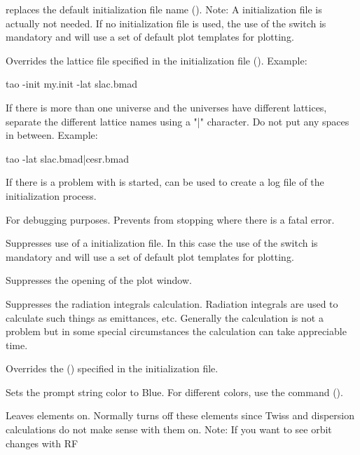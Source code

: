 \begin{description}
{{replaces the default \tao initialization file name
(). Note: A \tao initialization file is actually not
needed. If no \tao initialization file is used, the use of the
 switch is mandatory and \tao will use a set of default plot
templates for plotting.
%
\item[\vn{-lattice_file <file_name>}] \Newline
Overrides the 
lattice file specified in the \tao initialization file
(). Example:
\begin{example}
  tao -init my.init -lat slac.bmad
\end{example}
If there is more than one universe and the universes have different
lattices, separate the different lattice names using a "|" character.
Do not put any spaces in between. Example:
\begin{example}
  tao -lat slac.bmad|cesr.bmad
\end{example}
%
\item[\vn{-log_startup}]
If there is a problem with \tao is started,  can be used
to create a log file of the initialization process.
%
\item[\vn{-no_stopping}] \Newline
For debugging purposes. Prevents \tao from stopping where there is a fatal error.
%
\item[\vn{-noinit}] \Newline
Suppresses use of a \tao initialization file. In this case the use of
the  switch is mandatory and \tao will use a set of default
plot templates for plotting.
%
\item[\vn{-noplot}] \Newline
Suppresses the opening of the plot window.
%
\item[\vn{-no_rad_int}] \Newline
Suppresses the radiation integrals calculation. Radiation integrals are used to calculate such
things as emittances, etc. Generally the calculation is not a problem but in some special
circumstances the calculation can take appreciable time.
%
\item[\vn{-plot_file <file_name>}] \Newline
Overrides the  () specified in the
\tao initialization file.
%
\item[\vn{-prompt_color}] \Newline
Sets the prompt string color to Blue. For different colors, use the
 command ().
%
\item[\vn{-rf_on}]
Leaves  elements on. Normally \tao turns off these elements since Twiss and dispersion
calculations do not make sense with them on.  Note: If you want to see orbit changes with RF
}}
\end{description}
